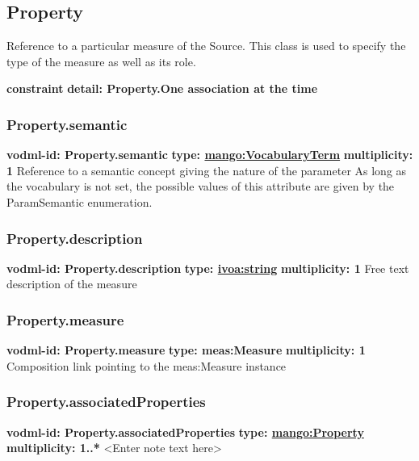   \subsection{Property}
  \label{sect:Property}
    Reference to a particular measure of the Source. This class is used to specify the type of the measure as well as its role.

    \noindent \textbf{constraint} \newline
    \indent    \textbf{detail: Property.One association at the time
 }\newline


    \subsubsection{Property.semantic}
      \textbf{vodml-id: Property.semantic} \newline
      \textbf{type: \hyperref[sect:VocabularyTerm]{mango:VocabularyTerm}} \newline
      \textbf{multiplicity: 1} \newline 
      Reference to a semantic concept giving the nature of the parameter As long as the vocabulary is not set, the possible values of this attribute are given by the ParamSemantic enumeration.

    \subsubsection{Property.description}
      \textbf{vodml-id: Property.description} \newline
      \textbf{type: \hyperref[sect:ivoa]{ivoa:string}} \newline
      \textbf{multiplicity: 1} \newline 
      Free text description of the measure

    \subsubsection{Property.measure}
      \textbf{vodml-id: Property.measure} \newline
      \textbf{type: meas:Measure} \newline
      \textbf{multiplicity: 1} \newline 
      Composition link pointing to the meas:Measure instance

    \subsubsection{Property.associatedProperties}
      \textbf{vodml-id: Property.associatedProperties} \newline
      \textbf{type: \hyperref[sect:Property]{mango:Property}} \newline
      \textbf{multiplicity: 1..*} \newline 
      <Enter note text here>

